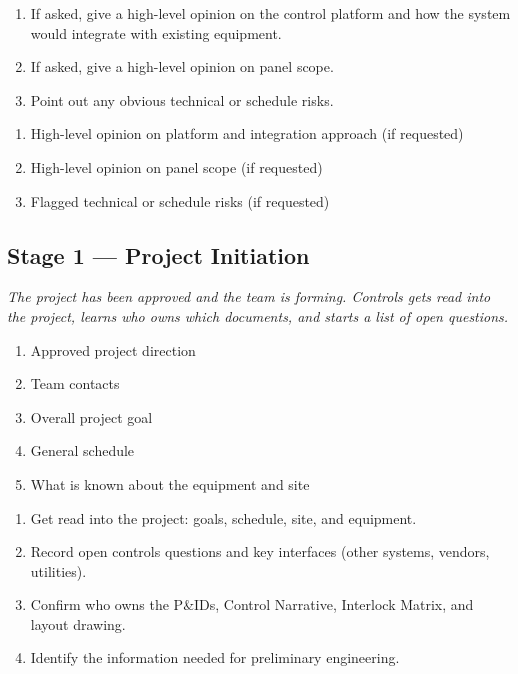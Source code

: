 \begin{enumerate}[itemsep=1pt]
  \item If asked, give a high-level opinion on the control platform and how the system would integrate with existing equipment.
  \item If asked, give a high-level opinion on panel scope.
  \item Point out any obvious technical or schedule risks.
\end{enumerate}

\begin{enumerate}[itemsep=1pt]
  \item High-level opinion on platform and integration approach (if requested)
  \item High-level opinion on panel scope (if requested)
  \item Flagged technical or schedule risks (if requested)
\end{enumerate}

\subsection{Stage 1 --- Project Initiation}
\textit{The project has been approved and the team is forming. Controls gets read into the project, learns who owns which documents, and starts a list of open questions.}

\begin{enumerate}[itemsep=1pt]
  \item Approved project direction
  \item Team contacts
  \item Overall project goal
  \item General schedule
  \item What is known about the equipment and site
\end{enumerate}

\begin{enumerate}[itemsep=1pt]
  \item Get read into the project: goals, schedule, site, and equipment.
  \item Record open controls questions and key interfaces (other systems, vendors, utilities).
  \item Confirm who owns the P\&IDs, Control Narrative, Interlock Matrix, and layout drawing.
  \item Identify the information needed for preliminary engineering.
\end{enumerate}

